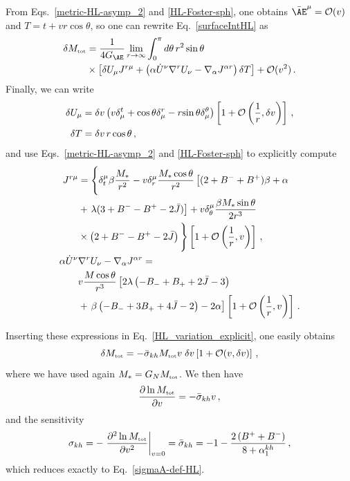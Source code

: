 \documentclass[prd,aps,twocolumn,nofootinbib,showpacs,superscriptaddress]{revtex4-1}
\newcommand\be{\begin{equation}}
\newcommand\ee{\end{equation}}
\def\kh{{kh}}
\newcommand{\nn}{\nonumber}
\newcommand{\tot}{{\mbox{\tiny tot}}}
\begin{document}
From Eqs.~\eqref{metric-HL-asymp_2} and \eqref{HL-Foster-sph}, one obtains
  $\bar{\AE}^\mu={\cal O}(v)$ and $T=t+v r \cos\theta$, so one can rewrite Eq.~\eqref{surfaceIntHL} as 
%
\begin{align}
\label{HL_variation_explicit}
\delta M_{\tot} &= \frac {1}{4 G_{\AE}}\lim_{r\to\infty} \int_{0}^\pi
d\theta\, r^2 \sin\theta  \nn \\ &\times\left[ \delta U_\mu
  J^{r\mu} +\left(\alpha \dot{U}^\nu \nabla^r U_\nu-\nabla_\alpha J^{\alpha
    r}\right) {\delta T}\right]+{\cal O}(v^2) \,.
\end{align}
%
Finally, we can write 
%
\begin{align}
\delta U_{\mu} &= \delta v\left (v \delta_\mu^t+ \cos\theta
\delta_\mu^r - r {\sin\theta} \delta_\mu^\theta\right)\left[1+{\cal O}\left(\frac1r,\delta v\right)\right]\,,\nn\\
\delta T& = \delta v \,r \cos\theta\,,
\end{align}
%
and use Eqs.~\eqref{metric-HL-asymp_2} and \eqref{HL-Foster-sph} to explicitly compute
%
\begin{align}
J^{r \mu} &=  \Bigg\{\delta^\mu_t \beta \frac{M_*}{r^2} -v \delta^\mu_r \frac{M_* \cos \theta}{r^{2}} 
\left[ (2 + B^- + B^+) \beta + \alpha 
\right. 
\nn \\ 
&+ \left.
\lambda (3 + B^- - B^+ - 2 \bar{J}) \right] + v \delta^\mu_\theta \frac{\beta M_* \sin \theta}{2 r^{3}} 
\nn \\
&\times \left(2 + B^- - B^+ - 2 \bar{J}\right) \Bigg\}
\left[1+{\cal{O}}\left(\frac1r,v\right)\right]\,,  
\\ 
\alpha \dot{U}^\nu & \nabla^r U_\nu-\nabla_\alpha J^{\alpha r} =\nn\\ & v \frac{  M \cos \theta}{r^{3}} 
\left[2 \lambda \left(-B_- +B_+ +2 \bar{J}-3\right)
\right. 
\nn \\
&+\left. 
\beta \left(-B_-+3 B_+ +4 \bar{J}-2\right)-2 \alpha\right]
\left[1+{\cal{O}}\left(\frac1r,v\right)\right]\,.
\end{align}
%

Inserting these expressions in Eq.~\eqref{HL_variation_explicit}, one
easily obtains
%
\be
\label{dMKH}
\delta M_{\tot} = -\bar{\sigma}_{\kh} M_{\tot}  v \; \delta v \left[1 +{\cal O}(v,\delta v)\right]
\,, \ee
%
where we have used again $M_*=G_N M_{\tot}$. We then have
\be 
\frac{\partial \ln M_{\tot} }{\partial {v}} = -\bar{\sigma}_{\kh} {v} \,, 
\ee
%
and the sensitivity 
%
\begin{equation}\label{sigmaA-def-HL2}
\sigma_{\kh} = - \left. \frac{\partial^2 \ln M_{\tot}}{\partial
  {v}^2}\right|_{v=0}=\bar{\sigma}_{\kh}=-1 - \frac{2 \left(B^{+} + B^{-}\right)}{8 + \alpha^{kh}_{1}}\,,
  \end{equation}
%
which reduces exactly to Eq.~\eqref{sigmaA-def-HL}. 
\end{document}

